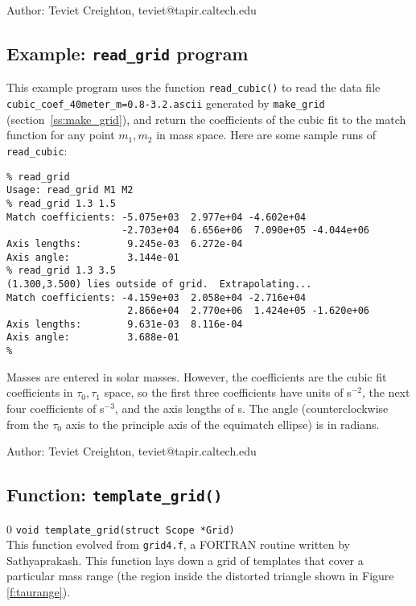 \begin{description}
\item{Author:}
  Teviet Creighton, teviet@tapir.caltech.edu
\end{description}


\clearpage
\subsection{Example: {\tt read\_grid} program}
\label{ss:read_grid}

This example program uses the function {\tt read\_cubic()} to read the
data file {\tt cubic\_coef\_40meter\_m=0.8-3.2.ascii} generated by
{\tt make\_grid} (section~\ref{ss:make_grid}), and return the
coefficients of the cubic fit to the match function for any point
$m_1,m_2$ in mass space.  Here are some sample runs of {\tt
read\_cubic}:

\begin{verbatim}
% read_grid 
Usage: read_grid M1 M2
% read_grid 1.3 1.5
Match coefficients: -5.075e+03  2.977e+04 -4.602e+04
                    -2.703e+04  6.656e+06  7.090e+05 -4.044e+06
Axis lengths:        9.245e-03  6.272e-04
Axis angle:          3.144e-01
% read_grid 1.3 3.5
(1.300,3.500) lies outside of grid.  Extrapolating...
Match coefficients: -4.159e+03  2.058e+04 -2.716e+04
                     2.866e+04  2.770e+06  1.424e+05 -1.620e+06
Axis lengths:        9.631e-03  8.116e-04
Axis angle:          3.688e-01
% 
\end{verbatim}

Masses are entered in solar masses.  However, the coefficients are the
cubic fit coefficients in $\tau_0,\tau_1$ space, so the first three
coefficients have units of s$^{-2}$, the next four coefficients of
s$^{-3}$, and the axis lengths of s.  The angle (counterclockwise from
the $\tau_0$ axis to the principle axis of the equimatch ellipse) is
in radians.


\begin{description}
\item{Author:}
  Teviet Creighton, teviet@tapir.caltech.edu
\end{description}



\clearpage
\subsection{Function: {\tt template\_grid()}}
\setcounter{equation}0
{\tt void template\_grid(struct Scope *Grid)}\\
This function evolved from {\tt grid4.f}, a FORTRAN routine written by
Sathyaprakash.  This function lays down a grid of templates
that cover a particular mass range (the region inside the distorted
triangle shown in Figure \ref{f:taurange}).

